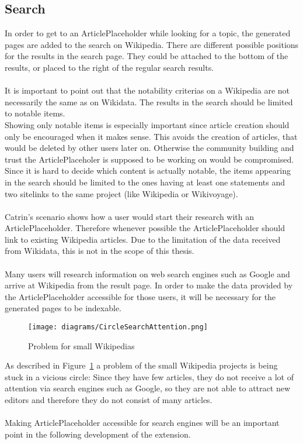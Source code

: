\subsection{Search}
In order to get to an ArticlePlaceholder while looking for a topic, the generated pages are added to the search on Wikipedia. There are different possible positions for the results in the search page. They could be attached to the bottom of the results, or placed to the right of the regular search results. \\
\\
It is important to point out that the notability criterias on a Wikipedia are not necessarily the same as on Wikidata. The results in the search should be limited to notable items. \\
Showing only notable items is especially important since article creation should only be encouraged when it makes sense. This avoids the creation of articles, that would be deleted by other users later on. Otherwise the community building and trust the ArticlePlaceholer is supposed to be working on would be compromised. \\
Since it is hard to decide which content is actually notable, the items appearing in the search should be limited to the ones having at least one statements and two sitelinks to the same project (like Wikipedia or Wikivoyage). \\
\\
Catrin's scenario shows how a user would start their research with an ArticlePlaceholder. Therefore whenever possible the ArticlePlaceholder should link to existing Wikipedia articles. Due to the limitation of the data received from Wikidata, this is not in the scope of this thesis. \\
\\
Many users will research information on web search engines such as Google and arrive at Wikipedia from the result page. In order to make the data provided by the ArticlePlaceholder accessible for those users, it will be necessary for the generated pages to be indexable.
\begin{figure}[H]
	\centering
	\texttt{[image: diagrams/CircleSearchAttention.png]}
	\caption{Problem for small Wikipedias}
	\label{fig:CircleSearch}
\end{figure}
As described in Figure~\ref{fig:CircleSearch} a problem of the small Wikipedia projects is being stuck in a vicious circle: Since they have few articles, they do not receive a lot of attention via search engines such as Google, so they are not able to attract new editors and therefore they do not consist of many articles. \\
\\
Making ArticlePlaceholder accessible for search engines will be an important point in the following development of the extension. 

